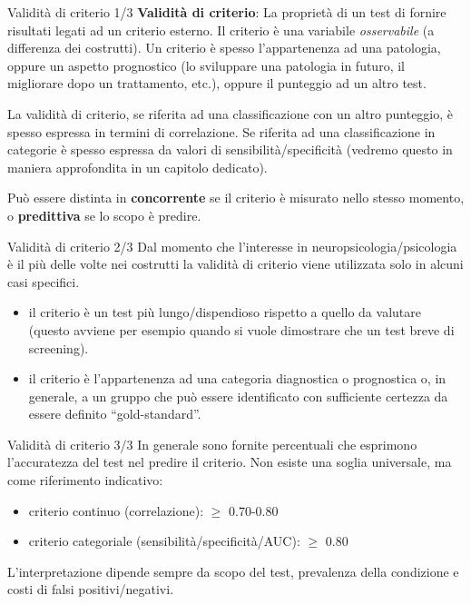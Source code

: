 \documentclass[
  ignorenonframetext,
]{beamer}
\providecommand{\tightlist}{%
  \setlength{\itemsep}{0pt}\setlength{\parskip}{0pt}}
\begin{document}
\begin{frame}{Validità di criterio 1/3}
\label{validituxe0-di-criterio-13}
\textbf{Validità di criterio}: La proprietà di un test di fornire
risultati legati ad un criterio esterno. Il criterio è una variabile
\emph{osservabile} (a differenza dei costrutti). Un criterio è spesso
l'appartenenza ad una patologia, oppure un aspetto prognostico (lo
sviluppare una patologia in futuro, il migliorare dopo un trattamento,
etc.), oppure il punteggio ad un altro test.

La validità di criterio, se riferita ad una classificazione con un altro
punteggio, è spesso espressa in termini di correlazione. Se riferita ad
una classificazione in categorie è spesso espressa da valori di
sensibilità/specificità (vedremo questo in maniera approfondita in un
capitolo dedicato).

Può essere distinta in \textbf{concorrente} se il criterio è misurato
nello stesso momento, o \textbf{predittiva} se lo scopo è predire.
\end{frame}

\begin{frame}{Validità di criterio 2/3}
\label{validituxe0-di-criterio-23}
Dal momento che l'interesse in neuropsicologia/psicologia è il più delle
volte nei costrutti la validità di criterio viene utilizzata solo in
alcuni casi specifici.

\begin{itemize}
\tightlist
\item
  il criterio è un test più lungo/dispendioso rispetto a quello da
  valutare (questo avviene per esempio quando si vuole dimostrare che un
  test breve di screening).
\item
  il criterio è l'appartenenza ad una categoria diagnostica o
  prognostica o, in generale, a un gruppo che può essere identificato
  con sufficiente certezza da essere definito ``gold-standard''.
\end{itemize}
\end{frame}

\begin{frame}{Validità di criterio 3/3}
\label{validituxe0-di-criterio-33}
In generale sono fornite percentuali che esprimono l'accuratezza del
test nel predire il criterio. Non esiste una soglia universale, ma come
riferimento indicativo:

\begin{itemize}
\tightlist
\item
  criterio continuo (correlazione): \(\geq\) 0.70-0.80
\item
  criterio categoriale (sensibilità/specificità/AUC): \(\geq\) 0.80
\end{itemize}

L'interpretazione dipende sempre da scopo del test, prevalenza della
condizione e costi di falsi positivi/negativi.
\end{frame}
\end{document}
